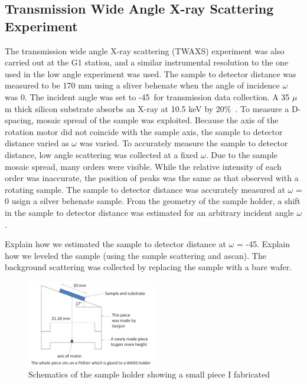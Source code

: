 \subsection{Transmission Wide Angle X-ray Scattering Experiment}
The transmission wide angle X-ray scattering (TWAXS) experiment was also 
carried out at the G1 station, and a similar instrumental resolution
to the one used in the low angle experiment was used.
The sample to detector distance was measured to be 170 mm using a sliver behenate 
when the angle of incidence $\omega$ was 0\textdegree.
The incident angle was set to -45\textdegree\ for transmission data
collection. A 35 $\mu$m thick silicon substrate absorbs an X-ray at
10.5 keV by 20\%\ \cite{ref:cxro}. 
To measure a D-spacing, mosaic spread of the sample was exploited. Because 
the axis of the rotation motor did not coincide with the sample axis,
the sample to detector distance varied as $\omega$ was varied. To accurately
measure the sample to detector distance, low angle scattering was collected
at a fixed $\omega$. Due to the sample mosaic spread, many orders were
visible. While the relative intensity of each order was inaccurate, 
the position of peaks was the same as that observed with a rotating sample.
The sample to detector distance was accurately measured at $\omega$ = 0\textdegree
usign a silver behenate sample. From the geometry of the sample holder,
a shift in the sample to detector distance was estimated for an arbitrary 
incident angle $\omega$.

Explain how we estimated the sample to detector distance at
$\omega$ = -45\textdegree. Explain how we leveled the sample 
(using the sample scattering and ascan).
The background scattering was collected by replacing the sample with a bare 
wafer.

\begin{figure}[htbp]
  \centering
  \includegraphics[width=0.5\textwidth]{figures/ripple/transmission/holder_drawing1}
  \caption{Schematics of the sample holder showing a small piece I fabricated}
\end{figure}

